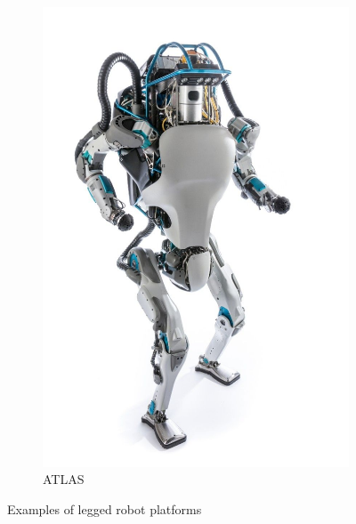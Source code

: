 \begin{figure}[h]
\begin{subfigure}[b]{0.32\textwidth}
        \includegraphics[width=\textwidth]{figures/biped_atlas.jpg}
        \caption{ATLAS}
        \label{fig:atlas}
    \end{subfigure}
    \caption{Examples of legged robot platforms}
\end{figure}







